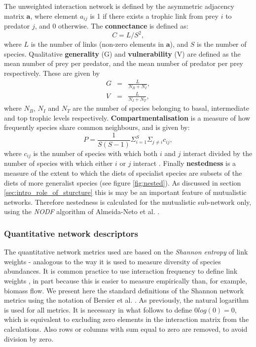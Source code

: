 The unweighted interaction network is defined by the asymmetric adjacency matrix $\mathbf{a}$, where element $a_{ij}$ is 1 if there exists a trophic link from prey $i$ to predator $j$, and 0 otherwise. The \textbf{connectance} is defined as:
\begin{equation}
C = L/S^2,
\label{eq:connectance}
\end{equation}
%
where $L$ is the number of links (non-zero elements in $\mathbf{a}$), and $S$ is the number of species. Qualitative \textbf{generality} (G) and \textbf{vulnerability} (V) are defined as the mean number of prey per predator, and the mean number of predator per prey respectively. These are given by
\begin{eqnarray}
G &=& \frac{L}{N_B + N_I}, \\[5pt]
V &=& \frac{L}{N_I + N_T}, 
\end{eqnarray}
%
where $N_B$, $N_I$ and $N_T$ are the number of species belonging to basal, intermediate and top trophic levels respectively. \textbf{Compartmentalisation} is a measure of how frequently species share common neighbours, and is given by:
\begin{equation}
P = \frac{1}{S(S-1)} \Sigma_{i=1}^S \Sigma_{j \neq i} c_{ij},
\label{eq:copart}
\end{equation}
%
where $c_{ij}$ is the number of species with which both $i$ and $j$ interact divided by the number of species with which either $i$ or $j$ interact \cite{lurgi2015effects}. Finally \textbf{nestedness} is a measure of the extent to which the diets of specialist species are subsets of the diets of more generalist species \cite{lurgi2015effects} (see figure \ref{fig:nested}). As discussed in section \ref{sec:intro_role_of_sturcture} this is may be an important feature of mutualistic networks. Therefore nestedness is calculated for the mutualistic sub-network only, using the \emph{NODF} algorithm of Almeida-Neto et al. \cite{almeida2008consistent}.

\subsubsection{Quantitative network descriptors}
\label{sec:def_quant_metrics}

The quantitative network metrics used are based on the \emph{Shannon entropy} of link weights - analogous to the way it is used to measure diversity of species abundances. It is common practice to use interaction frequency to define link weights \cite{lurgi2015effects,tylianakis2007habitat,bluthgen2006measuring}, in part because this is easier to measure empirically than, for example, biomass flow. We present here the standard definitions of the Shannon network metrics using the notation of Bersier et al. \cite{bersier2002quantitative}. As previously, the natural logarithm is used for all metrics. It is necessary in what follows to define $0log(0)=0$, which is equivalent to excluding zero elements in the interaction matrix from the calculations. Also rows or columns with sum equal to zero are removed, to avoid division by zero.    
 
